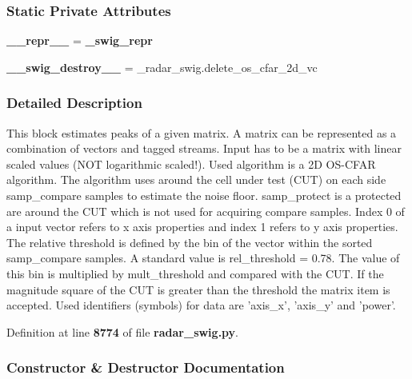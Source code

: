 \subsubsection*{Static Private Attributes}
\begin{DoxyCompactItemize}
\item 
{\bf \+\_\+\+\_\+repr\+\_\+\+\_\+} = {\bf \+\_\+swig\+\_\+repr}
\item 
{\bf \+\_\+\+\_\+swig\+\_\+destroy\+\_\+\+\_\+} = \+\_\+radar\+\_\+swig.\+delete\+\_\+os\+\_\+cfar\+\_\+2d\+\_\+vc
\end{DoxyCompactItemize}


\subsubsection{Detailed Description}
\begin{DoxyVerb}This block estimates peaks of a given matrix. A matrix can be represented as a combination of vectors and tagged streams. Input has to be a matrix with linear scaled values (NOT logarithmic scaled!). Used algorithm is a 2D OS-CFAR algorithm. The algorithm uses around the cell under test (CUT) on each side samp_compare samples to estimate the noise floor. samp_protect is a protected are around the CUT which is not used for acquiring compare samples. Index 0 of a input vector refers to x axis properties and index 1 refers to y axis properties. The relative threshold is defined by the bin of the vector within the sorted samp_compare samples. A standard value is rel_threshold = 0.78. The value of this bin is multiplied by mult_threshold and compared with the CUT. If the magnitude square of the CUT is greater than the threshold the matrix item is accepted. Used identifiers (symbols) for data are 'axis_x', 'axis_y' and 'power'.\end{DoxyVerb}
 

Definition at line {\bf 8774} of file {\bf radar\+\_\+swig.\+py}.



\subsubsection{Constructor \& Destructor Documentation}
